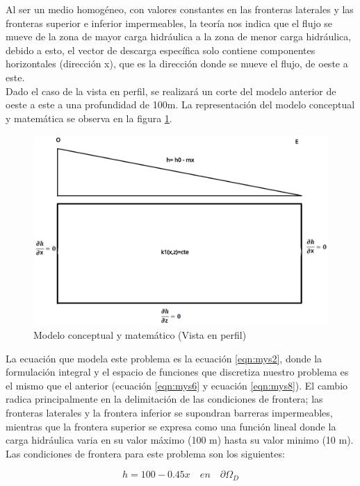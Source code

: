 Al ser un medio homogéneo, con valores constantes en las fronteras laterales y las fronteras superior e inferior impermeables, la teoría nos indica que el flujo se mueve de la zona de mayor carga hidráulica a la zona de menor carga hidráulica, debido a esto, el vector de descarga específica solo contiene componentes horizontales (dirección x), que es la dirección donde se mueve el flujo, de oeste a este. 
\\

Dado el caso de la vista en perfil, se realizará un corte del modelo anterior de oeste a este a una profundidad de 100m. La representación del modelo conceptual y matemática se observa en la figura \ref{Figura3:3}.

\begin{figure}[H]
\centering
\includegraphics[scale=0.35]{Figura_27a.png}
\caption{ Modelo conceptual y matemático (Vista en perfil)}
\label{Figura3:3}
\end{figure}


La ecuación que modela este problema es la ecuación \ref{eqn:mys2}, donde la formulación integral y el espacio de funciones que discretiza nuestro problema es el mismo que el anterior (ecuación \ref{eqn:mys6} y ecuación \ref{eqn:mys8}). El cambio radica principalmente en la delimitación de las condiciones de frontera; las fronteras laterales y la frontera inferior se supondran barreras impermeables, mientras que la frontera superior se expresa como una función lineal donde la carga hidráulica varia en su valor máximo (100 m) hasta su valor minimo (10 m). Las condiciones de frontera para este problema son los siguientes:  

\begin{equation}
 \label{eqn:mys9}
    h=100-0.45x \quad en \quad {\partial}\Omega_{D}  
\end{equation}
 

